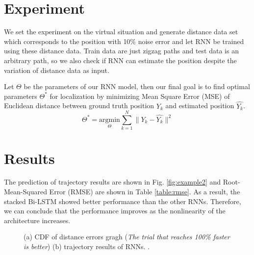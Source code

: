 \documentclass[letterpaper, 10 pt, conference]{ieeeconf}  %
\begin{document}
\section{Experiment}

 We set the experiment on the virtual situation and generate distance data set which corresponds to the position with 10\% noise error and let RNN be trained using these distance data. Train data are just zigzag paths and test data is an arbitrary path, so we also check if RNN can estimate the position despite the variation of distance data as input.
   
 Let $\Theta$ be the parameters of our RNN model, then our final goal is to find optimal parameters $\Theta^{*}$ for localization by minimizing Mean Square Error (MSE) of Euclidean distance between ground truth position $Y_k$ and estimated position $\hat{Y_k}$.
\begin{equation}
\Theta^{*} = \underset{\Theta}{\mathrm{argmin}} \sum_{k=1}^N \parallel Y_k - \hat{Y_k} \parallel^{2}
\end{equation}  

\section{Results}
 
 The prediction of trajectory results are shown in Fig. \ref{fig:example2} and Root-Mean-Squared Error (RMSE) are shown in Table \ref{table:rmse}. As a result, the stacked Bi-LSTM showed better performance than the other RNNs. Therefore, we can conclude that the performance improves as the nonlinearity of the architecture increases.
 
\begin{figure}[h]
	
	\centering
	\caption{ (a) CDF of distance errors gragh (\textit{The trial that reaches 100\% faster is better}) (b) trajectory results of RNNs. .}
	
\end{figure}
\end{document}
